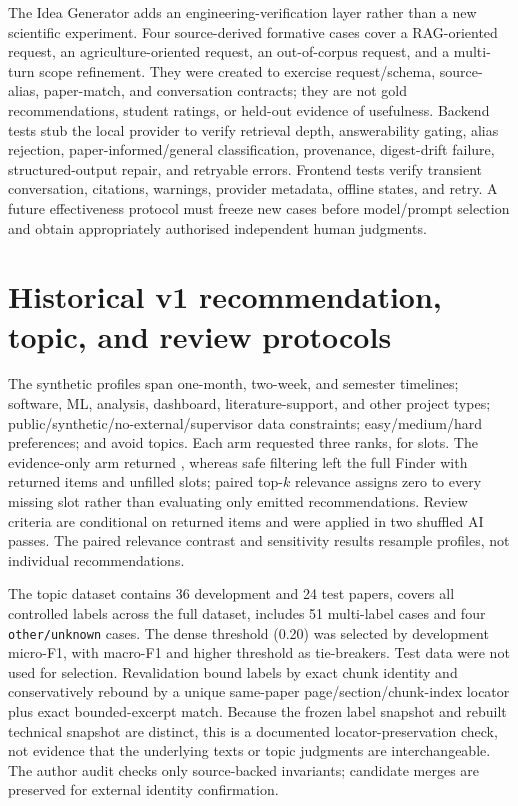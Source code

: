 The Idea Generator adds an engineering-verification layer rather than a new scientific experiment. Four source-derived formative cases cover a RAG-oriented request, an agriculture-oriented request, an out-of-corpus request, and a multi-turn scope refinement. They were created to exercise request/schema, source-alias, paper-match, and conversation contracts; they are not gold recommendations, student ratings, or held-out evidence of usefulness. Backend tests stub the local provider to verify retrieval depth, answerability gating, alias rejection, paper-informed/general classification, provenance, digest-drift failure, structured-output repair, and retryable errors. Frontend tests verify transient conversation, citations, warnings, provider metadata, offline states, and retry. A future effectiveness protocol must freeze new cases before model/prompt selection and obtain appropriately authorised independent human judgments.

\section{Historical v1 recommendation, topic, and review protocols}

The \RecommendationProfileCount{} synthetic profiles span one-month, two-week, and semester timelines; software, ML, analysis, dashboard, literature-support, and other project types; public/synthetic/no-external/supervisor data constraints; easy/medium/hard preferences; and avoid topics. Each arm requested three ranks, for \RecommendationRequestedSlotCount{} slots. The evidence-only arm returned \RecommendationEvidenceReturnedCount{}, whereas safe filtering left the full Finder with \RecommendationFullReturnedCount{} returned items and \RecommendationFullMissingCount{} unfilled slots; paired top-$k$ relevance assigns zero to every missing slot rather than evaluating only emitted recommendations. Review criteria are conditional on returned items and were applied in two shuffled AI passes. The paired relevance contrast and sensitivity results resample profiles, not individual recommendations.

The topic dataset contains 36 development and 24 test papers, covers all controlled labels across the full dataset, includes 51 multi-label cases and four \texttt{other/unknown} cases. The dense threshold (0.20) was selected by development micro-F1, with macro-F1 and higher threshold as tie-breakers. Test data were not used for selection. Revalidation bound \TopicExactBindingCount{} labels by exact chunk identity and conservatively rebound \TopicReboundBindingCount{} by a unique same-paper page/section/chunk-index locator plus exact bounded-excerpt match. Because the frozen label snapshot and rebuilt technical snapshot are distinct, this is a documented locator-preservation check, not evidence that the underlying texts or topic judgments are interchangeable. The author audit checks only source-backed invariants; candidate merges are preserved for external identity confirmation.

